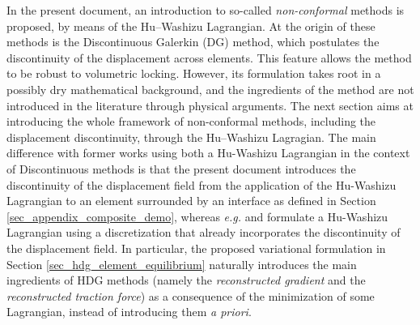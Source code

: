 In the present document, an introduction to so-called
\textit{non-conformal} methods is proposed, by means of the Hu–Washizu Lagrangian.
At the origin of these methods is the Discontinuous Galerkin (DG)
method, which postulates the discontinuity of the displacement across
elements. This feature allows the method to be robust to volumetric
locking. However, its formulation takes root in a possibly dry
mathematical background, and the ingredients of the method are not
introduced in the literature through physical arguments. The
next section aims at introducing the whole framework of non-conformal
methods, including the displacement discontinuity, through the
Hu–Washizu Lagragian.
The main difference with former works using both a Hu-Washizu Lagrangian in the context of Discontinuous methods is that the present document
introduces the discontinuity of the displacement field from the application of the Hu-Washizu Lagrangian to an element surrounded by an interface as defined in Section \ref{sec_appendix_composite_demo},
whereas \textit{e.g.} \cite{noels_general_2006} and \cite{neunteufel_three-field_2021} formulate a Hu-Washizu Lagrangian using a discretization that already incorporates the discontinuity of the displacement field.
In particular, the proposed variational formulation in Section \ref{sec_hdg_element_equilibrium} naturally introduces the main ingredients of HDG methods (namely the \textit{reconstructed gradient} and the \textit{reconstructed traction force}) as a consequence of the minimization of some Lagrangian, instead of introducing them \textit{a priori}.







